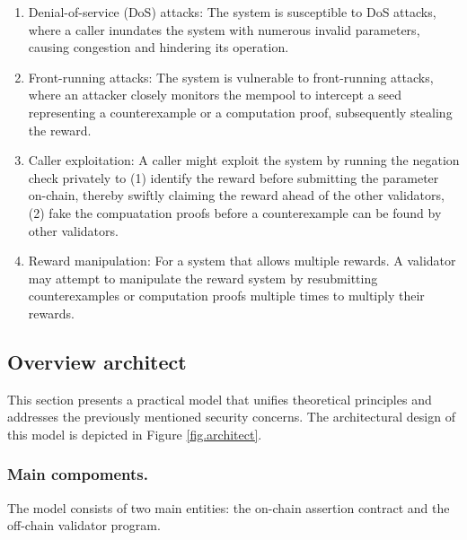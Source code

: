 \documentclass[runningheads]{llncs}
\begin{document}
\begin{enumerate}
\item Denial-of-service (DoS) attacks: The system is susceptible to DoS attacks, where a caller inundates the system with numerous invalid parameters, causing congestion and hindering its operation.
\item Front-running attacks: The system is vulnerable to front-running attacks, where an attacker closely monitors the mempool to intercept a seed representing a counterexample or a computation proof, subsequently stealing the reward.
\item Caller exploitation: A caller might exploit the system by running the negation check privately to (1) identify the reward before submitting the parameter on-chain, thereby swiftly claiming the reward ahead of the other validators, (2) fake the compuatation proofs before a counterexample can be found by other validators.
\item Reward manipulation: For a system that allows multiple rewards. A validator may attempt to manipulate the reward system by resubmitting counterexamples or computation proofs multiple times to multiply their rewards.
\end{enumerate}
\subsection{Overview architect}
This section presents a practical model that unifies theoretical principles and addresses the previously mentioned security concerns. The architectural design of this model is depicted in Figure \ref{fig.architect}.  
\subsubsection{Main compoments.} The model consists of two main entities: the on-chain assertion contract and the off-chain validator program.
\end{document}
